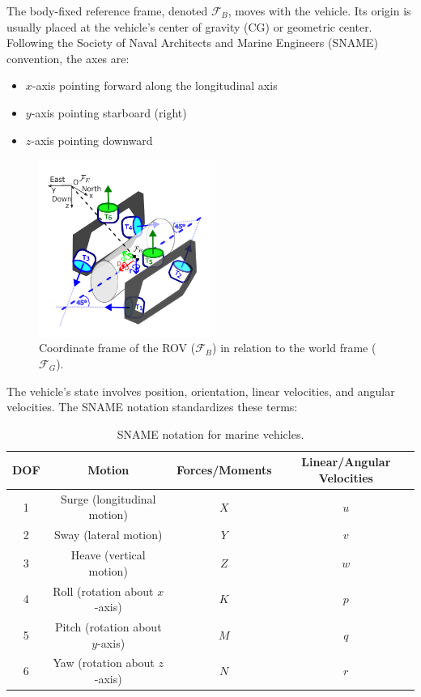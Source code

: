The body-fixed reference frame, denoted $\mathcal{F}_B$, moves with the vehicle. Its origin is usually placed at the vehicle's center of gravity (CG) or geometric center. Following the Society of Naval Architects and Marine Engineers (SNAME) convention, the axes are:
\begin{itemize}
    \item $x$-axis pointing forward along the longitudinal axis
    \item $y$-axis pointing starboard (right)
    \item $z$-axis pointing downward
\end{itemize}

\begin{figure}[h!] %
    \centering
    \includegraphics[width=0.5\textwidth]{Phd_thesis/chapters/1.Introduction/figures/brov4.pdf} %
    \caption{Coordinate frame of the ROV ($\mathcal{F}_B$) in relation to the world frame ($\mathcal{F}_G$).}
    \label{fig:rov-coord-frame}
\end{figure}

The vehicle's state involves position, orientation, linear velocities, and angular velocities. The SNAME notation standardizes these terms:

\begin{table}[h]
    \centering
    \begin{tabular}{|c|c|c|c|}
        \hline
        \textbf{DOF} & \textbf{Motion} & \textbf{Forces/Moments} & \textbf{Linear/Angular Velocities} \\
        \hline
        1 & Surge (longitudinal motion) & $X$ & $u$ \\
        2 & Sway (lateral motion) & $Y$ & $v$ \\
        3 & Heave (vertical motion) & $Z$ & $w$ \\
        4 & Roll (rotation about $x$-axis) & $K$ & $p$ \\
        5 & Pitch (rotation about $y$-axis) & $M$ & $q$ \\
        6 & Yaw (rotation about $z$-axis) & $N$ & $r$ \\
        \hline
    \end{tabular}
    \caption{SNAME notation for marine vehicles.}
    \label{tab:sname_notation}
\end{table}

